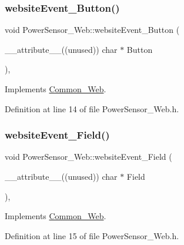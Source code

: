 \subsubsection{\texorpdfstring{website\+Event\+\_\+\+Button()}{websiteEvent\_Button()}}
{\footnotesize\ttfamily void Power\+Sensor\+\_\+\+Web\+::website\+Event\+\_\+\+Button (\begin{DoxyParamCaption}\item[{\+\_\+\+\_\+attribute\+\_\+\+\_\+((unused)) char $\ast$}]{Button }\end{DoxyParamCaption})\hspace{0.3cm}{\ttfamily [inline]}, {\ttfamily [virtual]}}



Implements \hyperlink{class_common___web_acd10f27b30f3111277b4730ee5495090}{Common\+\_\+\+Web}.



Definition at line 14 of file Power\+Sensor\+\_\+\+Web.\+h.

\mbox{\label{class_power_sensor___web_ab36fd816b46c6b030a0f4f2f48316c1e}} 
\subsubsection{\texorpdfstring{website\+Event\+\_\+\+Field()}{websiteEvent\_Field()}}
{\footnotesize\ttfamily void Power\+Sensor\+\_\+\+Web\+::website\+Event\+\_\+\+Field (\begin{DoxyParamCaption}\item[{\+\_\+\+\_\+attribute\+\_\+\+\_\+((unused)) char $\ast$}]{Field }\end{DoxyParamCaption})\hspace{0.3cm}{\ttfamily [inline]}, {\ttfamily [virtual]}}



Implements \hyperlink{class_common___web_a898e3fd8cc6384ecbbbd79c8a3a13b62}{Common\+\_\+\+Web}.



Definition at line 15 of file Power\+Sensor\+\_\+\+Web.\+h.

\mbox{\label{class_power_sensor___web_aae5b6cccf5a6eb3877e82e518fd69afa}} 
